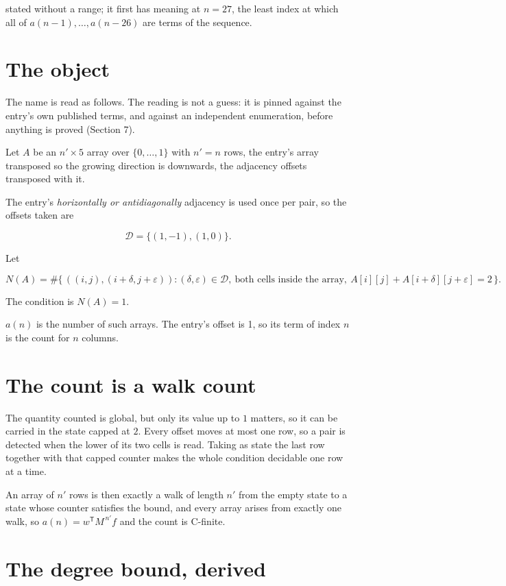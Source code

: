 \documentclass[11pt]{article}
\theoremstyle{definition}
\begin{document}
stated without a range; it first has meaning at $n = 27$, the least index at which all of $a(n-1),\dots,a(n-26)$ are terms of the sequence.

\section{The object}

The name is read as follows. The reading is not a guess: it is pinned against the entry's own published terms, and against an independent enumeration, before anything is proved (Section 7).

Let $A$ be an $n' \times 5$ array over $\{0,\dots,1\}$ with $n' = n$ rows, the entry's array transposed so the growing direction is downwards, the adjacency offsets transposed with it.

The entry's {\itshape horizontally or antidiagonally} adjacency is used once per pair, so the offsets taken are

\[\mathcal{D} = \{(1,-1), (1,0)\}.\]

Let

\[N(A) = \#\bigl\{\,((i,j),(i{+}\delta,j{+}\varepsilon)) : (\delta,\varepsilon) \in \mathcal{D},\ \text{both cells inside the array},\ A[i][j] + A[i{+}\delta][j{+}\varepsilon] = 2\,\bigr\}.\]

The condition is $N(A) = 1$.

$a(n)$ is the number of such arrays. The entry's offset is 1, so its term of index $n$ is the count for $n$ columns.

\section{The count is a walk count}

The quantity counted is global, but only its value up to $1$ matters, so it can be carried in the state capped at $2$. Every offset moves at most one row, so a pair is detected when the lower of its two cells is read. Taking as state the last row together with that capped counter makes the whole condition decidable one row at a time.

An array of $n'$ rows is then exactly a walk of length $n'$ from the empty state to a state whose counter satisfies the bound, and every array arises from exactly one walk, so $a(n) = w^{\mathsf T}M^{\,n'}f$ and the count is C-finite.

\section{The degree bound, derived}
\end{document}
